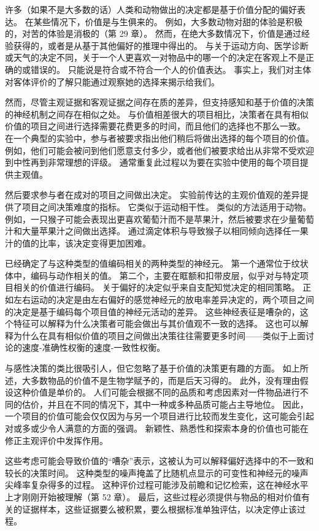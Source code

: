 许多（如果不是大多数的话）人类和动物做出的决定都是基于价值分配的偏好表达。 在某些情况下，价值是与生俱来的。 例如，大多数动物对甜的体验是积极的，对苦的体验是消极的（第 29 章）。 然而，在绝大多数情况下，价值是通过经验获得的，或者是从基于其他偏好的推理中得出的。 与关于运动方向、医学诊断或天气的决定不同，关于一个人更喜欢一对物品中的哪一个的决定在客观上不是正确的或错误的。 只能说是符合或不符合一个人的价值表达。 事实上，我们对主体对客体评价的了解只能通过观察她的选择来揭示给我们。

然而，尽管主观证据和客观证据之间存在质的差异，但支持感知和基于价值的决策的神经机制之间存在相似之处。 与价值相差很大的项目相比，决策者在具有相似价值的项目之间进行选择需要花费更多的时间，而且他们的选择也不那么一致。 在一个典型的实验中，参与者被要求指出他们稍后将做出选择的每个项目的价值。 例如，他们可能会被问到他们愿意支付多少，或者他们被要求给出从非常不受欢迎到中性再到非常理想的评级。 通常重复此过程以为要在实验中使用的每个项目提供主观值。

然后要求参与者在成对的项目之间做出决定。 实验前传达的主观价值观的差异提供了项目之间决策难度的指标。 它类似于运动相干性。 类似的方法适用于动物。 例如，一只猴子可能会表现出更喜欢葡萄汁而不是苹果汁，然后被要求在少量葡萄汁和大量苹果汁之间做出选择。 通过滴定体积与导致猴子以相同倾向选择任一果汁的值的比率，该决定变得更加困难。

已经确定了与这种类型的值编码相关的两种类型的神经元。 第一个通常位于纹状体中，编码与动作相关的值。 第二个，主要在眶额和扣带皮层，似乎对与特定项目相关的价值进行编码。 关于偏好的决定似乎来自支配知觉决定的相同策略。 正如左右运动的决定是由左右偏好的感觉神经元的放电率差异决定的，两个项目之间的决定是基于编码每个项目值的神经元活动的差异。 这些神经表征是嘈杂的，这个特征可以解释为什么决策者可能会做出与其价值观不一致的选择。 这也可以解释为什么在具有相似价值的项目之间做出决策往往需要更多时间——类似于上面讨论的速度-准确性权衡的速度-一致性权衡。

与感性决策的类比很吸引人，但它忽略了基于价值的决策更有趣的方面。 如上所述，大多数物品的价值不是生物学赋予的，而是后天习得的。 此外，没有理由假设这种价值是单价的。 人们可能会根据不同的品质和考虑因素对一件物品进行不同的估价，并且在不同的情况下，其中一种或多种品质可能占主导地位。 因此，一个项目的价值可能会仅仅因为与另一个项目进行比较而发生变化，这可能会引起对或多或少令人满意的方面的强调。 新颖性、熟悉性和探索本身的价值也可能在修正主观评价中发挥作用。

这些考虑可能会导致价值的“嘈杂”表示，这被认为可以解释偏好选择中的不一致和较长的决策时间。 这种类型的噪声掩盖了比随机点显示的可变性和神经元的噪声尖峰率复杂得多的过程。 这种评价过程可能涉及前瞻和记忆检索，这在神经水平上才刚刚开始被理解（第 52 章）。 最后，这些过程必须提供与物品的相对价值有关的证据样本，这些证据要么被积累，要么根据标准单独评估，以决定停止该过程。

